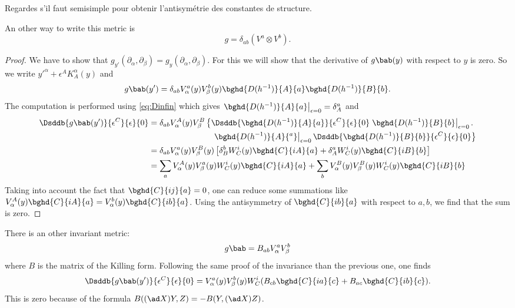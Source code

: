 \begin{probleme}
Regardes s'il faut semisimple pour obtenir l'antisymétrie des constantes de structure.
\end{probleme}

An other way to write this metric is 
\[
  g=\delta_{ab}(V^a\otimes V^b).
\]

\begin{proof}
We have to show that $g_{y'}(\partial_{\alpha},\partial_{\beta})=g_y(\partial_{\alpha},\partial_{\beta})$. For this we will show that the derivative of $g\bab(y)$ with respect to $y$ is zero. So we write ${y'}^{\alpha}+\epsilon^AK_A^{\alpha}(y)$ and 
\[
   g\bab(y')=\delta_{ab}V^a_{\alpha}(y)V^b_{\beta}(y)\bghd{D(h^{-1})}{A}{a}\bghd{D(h^{-1})}{B}{b}.
\]
The computation is performed using \eqref{eq:Dinfin} which gives $\left.\bghd{ D(h^{-1}) }{A}{a}\right|_{\epsilon=0}=\delta^a_A$ and 
\begin{equation}
\begin{split}
  \Dsddb{  g\bab(y')  }{\epsilon^C}{\epsilon}{0}&=\delta_{ab}V_{\alpha}^A(y)V_{\beta}^B
                                       \left\{  
     \Dsddb{  \bghd{D(h^{-1})}{A}{a}  }{\epsilon^C}{\epsilon}{0}\left.\bghd{D(h^{-1})}{B}{b}\right|_{\epsilon=0}.
                                       \right.\\
 &\phantom{ =\delta_{ab}V_{\alpha}^A(y)V_{\beta}^B  }\quad  \left. \left.\bghd{D(h^{-1})}{A}{^a}\right|_{\epsilon=0}\Dsddb{ \bghd{D(h^{-1})}{B}{b} }{\epsilon^C}{\epsilon}{0}\right\}\\
&=\delta_{ab}V^a_{\alpha}(y)V_{\beta}^B(y)\left[  \delta_B^bW^i_C(y)\bghd{C}{iA}{a}+\delta_A^a W^i_C(y)\bghd{C}{iB}{b}  \right]\\
&=\sum_a V^A_{\alpha}(y)V_{\beta}^a(y)W^i_C(y)\bghd{C}{iA}{a}+\sum_b V^B_{\alpha}(y)V_{\beta}^B(y)W^i_C(y)\bghd{C}{iB}{b}
\end{split}
\end{equation}
Taking into account the fact that $\bghd{C}{ij}{a}=0$, one can reduce some summations like $V_{\alpha}^A(y)\bghd{C}{iA}{a}=V_{\alpha}^b(y)\bghd{C}{ib}{a}$. Using the antisymmetry of $\bghd{C}{ib}{a}$ with respect to $a,b$, we find that the sum is zero.

\end{proof}

There is an other invariant metric:
\begin{equation}
   g\bab=B_{ab}V_{\alpha}^aV_{\beta}^b
\end{equation}
where $B$ is the matrix of the Killing form. Following the same proof of the invariance than the previous one, one finds
\[
  \Dsddb{ g\bab(y') }{\epsilon^C}{\epsilon}{0}=V^a_{\alpha}(y)V^b_{\beta}(y)W_C^i( B_{cb}\bghd{C}{ia}{c}+
                               B_{ac}\bghd{C}{ib}{c} ).
\]
This is zero because of the formula $B((\ad X) Y,Z)=-B(Y,(\ad X) Z)$. 


